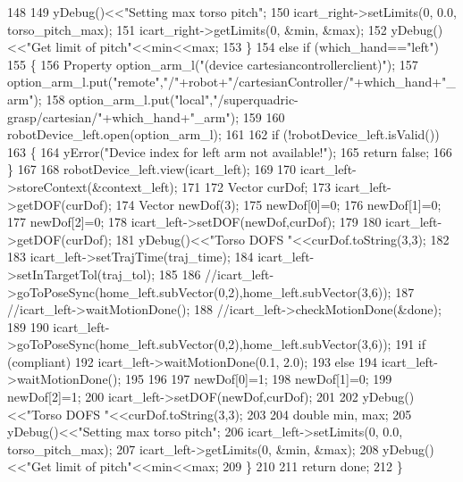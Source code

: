 \begin{DoxyCode}
148 
149         yDebug()<<\textcolor{stringliteral}{"Setting max torso pitch"};
150         icart\_right->setLimits(0, 0.0, torso\_pitch\_max);     
151         icart\_right->getLimits(0, &min, &max);
152         yDebug()<<\textcolor{stringliteral}{"Get limit of pitch"}<<min<<max;
153     \}
154     \textcolor{keywordflow}{else} \textcolor{keywordflow}{if} (which\_hand==\textcolor{stringliteral}{"left"})
155     \{
156         Property option\_arm\_l(\textcolor{stringliteral}{"(device cartesiancontrollerclient)"});
157         option\_arm\_l.put(\textcolor{stringliteral}{"remote"},\textcolor{stringliteral}{"/"}+robot+\textcolor{stringliteral}{"/cartesianController/"}+which\_hand+\textcolor{stringliteral}{"\_arm"});
158         option\_arm\_l.put(\textcolor{stringliteral}{"local"},\textcolor{stringliteral}{"/superquadric-grasp/cartesian/"}+which\_hand+\textcolor{stringliteral}{"\_arm"});
159 
160         robotDevice\_left.open(option\_arm\_l);
161 
162         \textcolor{keywordflow}{if} (!robotDevice\_left.isValid())
163         \{
164             yError(\textcolor{stringliteral}{"Device index for left arm not available!"});
165             \textcolor{keywordflow}{return} \textcolor{keyword}{false};
166         \}
167 
168         robotDevice\_left.view(icart\_left);
169 
170         icart\_left->storeContext(&context\_left);
171 
172         Vector curDof;
173         icart\_left->getDOF(curDof);
174         Vector newDof(3);
175         newDof[0]=0;
176         newDof[1]=0;
177         newDof[2]=0;
178         icart\_left->setDOF(newDof,curDof);
179 
180         icart\_left->getDOF(curDof);
181         yDebug()<<\textcolor{stringliteral}{"Torso DOFS "}<<curDof.toString(3,3);
182 
183         icart\_left->setTrajTime(traj\_time);
184         icart\_left->setInTargetTol(traj\_tol);
185 
186         \textcolor{comment}{//icart\_left->goToPoseSync(home\_left.subVector(0,2),home\_left.subVector(3,6));}
187         \textcolor{comment}{//icart\_left->waitMotionDone();}
188         \textcolor{comment}{//icart\_left->checkMotionDone(&done);}
189 
190         icart\_left->goToPoseSync(home\_left.subVector(0,2),home\_left.subVector(3,6));
191         \textcolor{keywordflow}{if} (compliant)
192             icart\_left->waitMotionDone(0.1, 2.0);
193         \textcolor{keywordflow}{else}
194             icart\_left->waitMotionDone();
195 
196 
197         newDof[0]=1;
198         newDof[1]=0;
199         newDof[2]=1;
200         icart\_left->setDOF(newDof,curDof);
201 
202         yDebug()<<\textcolor{stringliteral}{"Torso DOFS "}<<curDof.toString(3,3);
203 
204         \textcolor{keywordtype}{double} min, max;
205         yDebug()<<\textcolor{stringliteral}{"Setting max torso pitch"};
206         icart\_left->setLimits(0, 0.0, torso\_pitch\_max);
207         icart\_left->getLimits(0, &min, &max);
208         yDebug()<<\textcolor{stringliteral}{"Get limit of pitch"}<<min<<max;     
209     \}
210 
211     \textcolor{keywordflow}{return} done;
212 \}
\end{DoxyCode}

